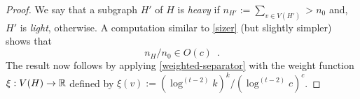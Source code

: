 \documentclass[kpfonts]{patmorin}
\newcommand\numberthis{\addtocounter{equation}{1}\tag{\theequation}}
\theoremstyle{named}
\begin{document}
\begin{proof}
    We say that a subgraph $H'$ of $H$ is \emph{heavy} if    $n_{H'}:=\sum_{v\in V(H')} > n_0$ and, $H'$ is \emph{light}, otherwise.
    A computation similar to \cref{sizer} (but slightly simpler) shows that
    \begin{equation}
        n_H/n_0 \in O(c) \enspace . \label{heavy-size}
    \end{equation}
    The result now follows by applying \cref{weighted-separator} with the weight function $\xi:V(H)\to\mathbb{R}$ defined by $\xi(v):=(\log^{(t-2)} k)^k/(\log^{(t-2)} c)^{c}$.
\end{proof}
\end{document}
